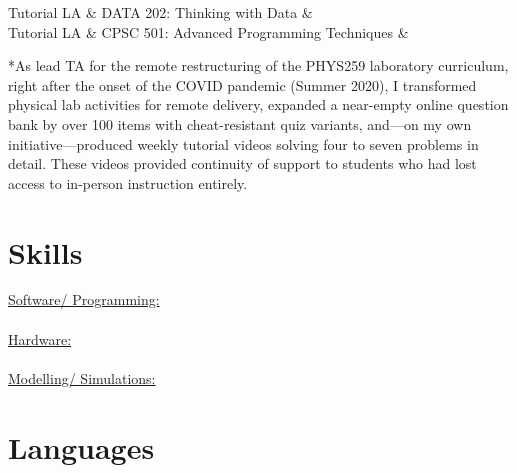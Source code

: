 \begin{ta_table}

	Tutorial LA  &  DATA 202: Thinking with Data &    \\
	Tutorial LA  &  CPSC 501: Advanced Programming Techniques &    \\

\end{ta_table}


*As lead TA for the remote restructuring of the PHYS259 laboratory curriculum, right after the onset of the COVID pandemic (Summer 2020), I transformed physical lab activities for remote delivery, expanded a near-empty online question bank by over 100 items with cheat-resistant quiz variants, and—on my own initiative—produced weekly tutorial videos solving four to seven problems in detail. These videos provided continuity of support to students who had lost access to in-person instruction entirely. \\




\begin{minipage}[t]{0.67\textwidth}  %

\section{Skills}

\begin{Summary}{}
	\underline{Software/ Programming:} \ \
	\\ \\
	\underline{Hardware:} \ \
	\veritem{Antennae}
	\\ \\
	\underline{Modelling/ Simulations:} \ \

\end{Summary}
\end{minipage}
\hspace{0.03\textwidth}
\begin{minipage}[t]{0.3\textwidth}  %


\section{Languages}
\end{minipage}
